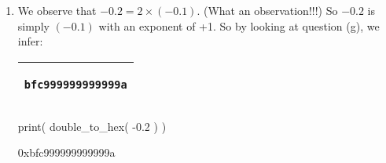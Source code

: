\documentclass[pdftex,11pt]{article}
\begin{document}
\begin{enumerate}
\begin{comment}
\end{comment}


\item We observe that $ -0.2  = 2 \times (-0.1) $.
(What an observation!!!) 
So $-0.2$ is simply $(-0.1)$ with an exponent of +1.
So by looking at question (g), we infer:
\begin{center}
\begin{tabular}{|c|}
\hline
\begin{minipage}{0.17\textwidth}
\begin{verbatim}
bfc999999999999a
\end{verbatim}
\end{minipage}\\
\hline
\end{tabular}
\end{center}




\begin{python}
print( double_to_hex( -0.2 ) )
\end{python}
\begin{pythonoutput}
0xbfc999999999999a
\end{pythonoutput}




\begin{comment}

\underline{Matlab Check}:
\begin{verbatim}

>> format hex; -0.2, format

ans =

   bfc999999999999a

\end{verbatim}



\end{comment}
\end{enumerate}
\end{document}
